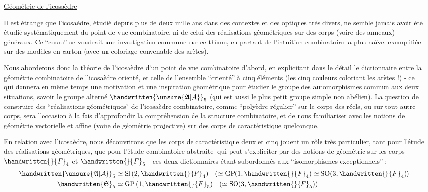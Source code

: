 \uline{Géométrie de l'icosaèdre}

Il est étrange que l'icosaèdre, étudié depuis plus de deux mille ans dans des contextes et des optiques très divers, ne semble jamais avoir été étudié systématiquement du point de vue combinatoire, ni de celui des réalisations géométriques sur des corps (voire des anneaux) généraux. Ce ``cours'' se voudrait une investigation commune sur ce thème, en partant de l'intuition combinatoire la plus naïve, exemplifiée sur des modèles en carton (avec un coloriage convenable des arètes).

Nous aborderons donc la théorie de l'icosaèdre d'un point de vue combinatoire d'abord, en explicitant dans le détail le dictionnaire entre la géométrie combinatoire de l'icosaèdre orienté, et celle de l'ensemble ``orienté'' à cinq éléments (les cinq couleurs coloriant les arètes !) - ce qui donnera en même temps une motivation et une inspiration géométrique pour étudier le groupe des automorphismes commun aux deux situations, savoir le groupe alterné $\handwritten{\unsure{\mathfrak A|\mathcal A}}_5$ (qui est aussi le plus petit groupe simple non abélien). La question de construire des ``réalisations géométriques'' de l'icosaèdre combinatoire, comme ``polyèdre régulier'' sur le corps des réels, ou sur tout autre corps, sera l'occasion à la fois d'approfondir la compréhension de la structure combinatoire, et de nous familiariser avec les notions de géométrie vectorielle et affine (voire de géométrie projective) sur des corps de caractéristique quelconque.

En relation avec l'icosaèdre, nous découvrirons que les corps de caractéristique deux et cinq jouent un rôle très particulier, tant pour l'étude des réalisations géométriques, que pour l'étude combinatoire abstraite, qui peut s'expliciter par des notions de géométrie sur les corps ${\handwritten{\mathbb}{F}}_4$ et ${\handwritten{\mathbb}{F}}_5$ - ces deux dictionnaires étant subordonnés aux ``isomorphismes exceptionnels'' :
\[
 \begin{aligned}
 \handwritten{\unsure{\mathfrak A|\mathcal A}}_5 &\simeq \mathrm{Sl}\,(2,{\handwritten{\mathbb}{F}}_4)\quad(\simeq\mathrm{GP}(1,{\handwritten{\mathbb}{F}}_4)\simeq\mathrm{SO}(3,{\handwritten{\mathbb}{F}}_4))\\
 \handwritten{\mathfrak S}_5 &\simeq \mathrm{GP}\,(1,{\handwritten{\mathbb}{F}}_5)\quad(\simeq\mathrm{SO}(3,{\handwritten{\mathbb}{F}}_5))\ .
 \end{aligned}
\]

